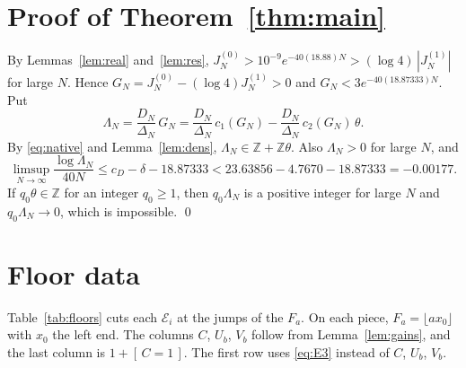 \documentclass{amsart}
\numberwithin{equation}{section}
\numberwithin{table}{section}
\newcommand{\Z}{\mathbb{Z}}
\newcommand{\fl}[1]{\lfloor #1\rfloor}
\newcommand{\br}[1]{[\,#1\,]}
\begin{document}
\section{Proof of Theorem~\ref{thm:main}}\label{sec:proof}

By Lemmas~\ref{lem:real} and~\ref{lem:res},
$J_N^{(0)}>10^{-9}e^{-40(18.88)N}>(\log4)\,|J_N^{(1)}|$ for large $N$.
Hence $G_N=J_N^{(0)}-(\log4)J_N^{(1)}>0$ and $G_N<3e^{-40(18.87333)N}$. Put
\[
\Lambda_N=\frac{D_N}{\Delta_N}\,G_N
=\frac{D_N}{\Delta_N}\,c_1(G_N)-\frac{D_N}{\Delta_N}\,c_2(G_N)\,\theta .
\]
By \eqref{eq:native} and Lemma~\ref{lem:dens}, $\Lambda_N\in\Z+\Z\theta$.
Also $\Lambda_N>0$ for large $N$, and
\[
\limsup_{N\to\infty}\frac{\log\Lambda_N}{40N}\le c_D-\delta-18.87333
<23.63856-4.7670-18.87333=-0.00177 .
\]
If $q_0\theta\in\Z$ for an integer $q_0\ge1$, then $q_0\Lambda_N$ is a
positive integer for large $N$ and $q_0\Lambda_N\to0$, which is impossible.
\qed

\appendix

\section{Floor data}\label{app:floor}

Table~\ref{tab:floors} cuts each $\mathcal E_i$ at the jumps of the $F_a$.
On each piece, $F_a=\fl{ax_0}$ with $x_0$ the left end. The columns $C$,
$U_b$, $V_b$ follow from Lemma~\ref{lem:gains}, and the last column is
$1+\br{C=1}$. The first row uses \eqref{eq:E3} instead of $C$, $U_b$, $V_b$.
\end{document}
